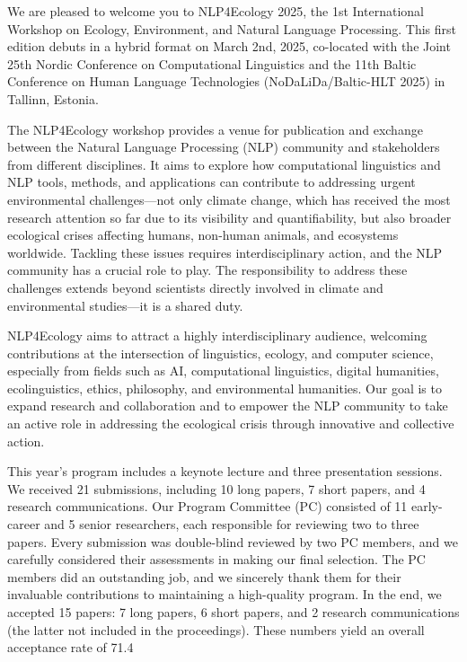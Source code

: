 We are pleased to welcome you to NLP4Ecology 2025, the 1st International Workshop on Ecology, Environment, and Natural Language Processing. This first edition debuts in a hybrid format on March 2nd, 2025, co-located with the Joint 25th Nordic Conference on Computational Linguistics and the 11th Baltic Conference on Human Language Technologies (NoDaLiDa/Baltic-HLT 2025) in Tallinn, Estonia.

The NLP4Ecology workshop provides a venue for publication and exchange between the Natural Language Processing (NLP) community and stakeholders from different disciplines. It aims to explore how computational linguistics and NLP tools, methods, and applications can contribute to addressing urgent environmental challenges—not only climate change, which has received the most research attention so far due to its visibility and quantifiability, but also broader ecological crises affecting humans, non-human animals, and ecosystems worldwide. Tackling these issues requires interdisciplinary action, and the NLP community has a crucial role to play. The responsibility to address these challenges extends beyond scientists directly involved in climate and environmental studies—it is a shared duty.

NLP4Ecology aims to attract a highly interdisciplinary audience, welcoming contributions at the intersection of linguistics, ecology, and computer science, especially from fields such as AI, computational linguistics, digital humanities, ecolinguistics, ethics, philosophy, and environmental humanities. Our goal is to expand research and collaboration and to empower the NLP community to take an active role in addressing the ecological crisis through innovative and collective action.

This year's program includes a keynote lecture and three presentation sessions. We received 21 submissions, including 10 long papers, 7 short papers, and 4 research communications. Our Program Committee (PC) consisted of 11 early-career and 5 senior researchers, each responsible for reviewing two to three papers. Every submission was double-blind reviewed by two PC members, and we carefully considered their assessments in making our final selection. The PC members did an outstanding job, and we sincerely thank them for their invaluable contributions to maintaining a high-quality program. In the end, we accepted 15 papers: 7 long papers, 6 short papers, and 2 research communications (the latter not included in the proceedings). These numbers yield an overall acceptance rate of 71.4%

